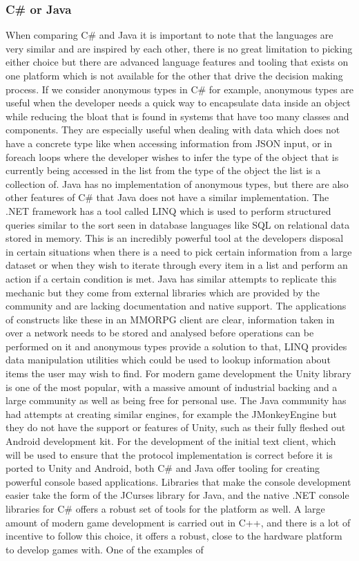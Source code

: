 \documentclass{article}
\begin{document}
	\subsubsection{C\# or Java}
	When comparing C\# and Java it is important to note that the languages are very similar and are inspired by each other, there is no great limitation to picking either choice but there are advanced language features and tooling that exists on one platform which is not available for the other that drive the decision making process. If we consider anonymous types in C\# for example, anonymous types are useful when the developer needs a quick way to encapsulate data inside an object while reducing the bloat that is found in systems that have too many classes and components. They are especially useful when dealing with data which does not have a concrete type like when accessing information from JSON input, or in foreach loops where the developer wishes to infer the type of the object that is currently being accessed in the list from the type of the object the list is a collection of. Java has no implementation of anonymous types, but there are also other features of C\# that Java does not have a similar implementation. The .NET framework has a tool called LINQ which is used to perform structured queries similar to the sort seen in database languages like SQL on relational data stored in memory. This is an incredibly powerful tool at the developers disposal in certain situations when there is a need to pick certain information from a large dataset or when they wish to iterate through every item in a list and perform an action if a certain condition is met. Java has similar attempts to replicate this mechanic but they come from external libraries which are provided by the community and are lacking documentation and native support. The applications of constructs like these in an MMORPG client are clear, information taken in over a network needs to be stored and analysed before operations can be performed on it and anonymous types provide a solution to that, LINQ provides data manipulation utilities which could be used to lookup information about items the user may wish to find. For modern game development the Unity library is one of the most popular, with a massive amount of industrial backing and a large community as well as being free for personal use\cite{Unity3D}. The Java community has had attempts at creating similar engines, for example the JMonkeyEngine\cite{JMonkey} but they do not have the support or features of Unity, such as their fully fleshed out Android development kit. For the development of the initial text client, which will be used to ensure that the protocol implementation is correct before it is ported to Unity and Android, both C\# and Java offer tooling for creating powerful console based applications. Libraries that make the console development easier take the form of the JCurses library\cite{JCurses} for Java, and the native .NET console libraries for C\# offers a robust set of tools for the platform as well. A large amount of modern game development is carried out in C++, and there is a lot of incentive to follow this choice, it offers a robust, close to the hardware platform to develop games with. One of the examples of 
\end{document}

